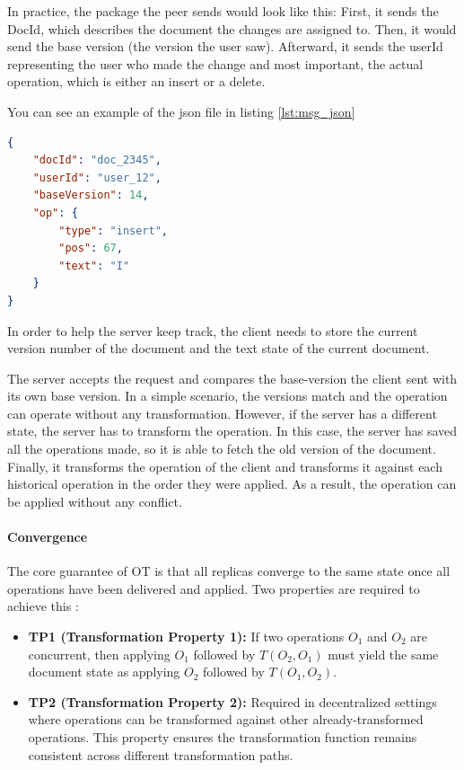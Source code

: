 In practice, the package the peer sends would look like this: First, it sends the DocId, which describes
the document the changes are assigned to. Then, it would send the base version (the version the user saw).
Afterward, it sends the userId representing the user who made the change and most important, the actual operation,
which is either an insert or a delete.

You can see an example of the json file in listing \ref{lst:msg_json}

\begin{lstlisting}[language=json, label=lst:msg_json]
{
    "docId": "doc_2345",
    "userId": "user_12",
    "baseVersion": 14,
    "op": {
        "type": "insert",
        "pos": 67,
        "text": "I"
    }
}
\end{lstlisting}
In order to help the server keep track, the client needs to store the current
version number of the document and the text state of the current document.

The server accepts the request and compares the base-version the client sent with
its own base version. In a simple scenario, the versions match and the operation can
operate without any transformation. However, if the server has a different state, the server
has to transform the operation. In this case, the server has saved all the operations made, so it
is able to fetch the old version of the document. Finally, it transforms the operation of the client
and transforms it against each historical operation in the order they were applied. As a result, the operation
can be applied without any conflict.

\paragraph{Convergence}

The core guarantee of OT is that all replicas converge to the same state once all operations have been
delivered and applied. Two properties are required to achieve this \cite{ellis1989concurrency}:

\begin{itemize}
    \item \textbf{TP1 (Transformation Property 1):} If two operations $O_1$ and $O_2$ are concurrent,
    then applying $O_1$ followed by $T(O_2, O_1)$ must yield the same document state as applying $O_2$
    followed by $T(O_1, O_2)$.
    \item \textbf{TP2 (Transformation Property 2):} Required in decentralized settings where operations
    can be transformed against other already-transformed operations. This property ensures the
    transformation function remains consistent across different transformation paths.
\end{itemize}

